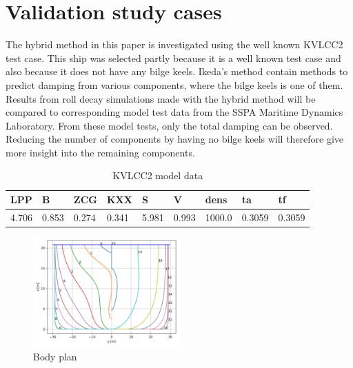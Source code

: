 \section{Validation study cases}\label{validation-study-cases}

\label{sec:validation}

    The hybrid method in this paper is investigated using the well known
KVLCC2 test case. This ship was selected partly because it is a well
known test case and also because it does not have any bilge keels.
Ikeda's method contain methods to predict damping from various
components, where the bilge keels is one of them. Results from roll
decay simulations made with the hybrid method will be compared to
corresponding model test data from the SSPA Maritime Dynamics
Laboratory. From these model tests, only the total damping can be
observed. Reducing the number of components by having no bilge keels
will therefore give more insight into the remaining components.
 
            
    
    
\begin{table}[H]
\small
\center
\caption{KVLCC2 model data}
\label{tab:kvlcc2_model_data}
\begin{tabular}{lllllllll}
\toprule\addlinespace
LPP & B & ZCG & KXX & S & V & dens & ta & tf\\ 
\midrule4.706 & 0.853 & 0.274 & 0.341 & 5.981 & 0.993 & 1000.0 & 0.3059 & 0.3059\\ 

\bottomrule
\end{tabular}
\end{table}

    
 
            
    
    \begin{figure}[H]
        \begin{center}\includegraphics[width = 0.5\textwidth]{figures/body_plan.png}\end{center}
        \vspace{-1cm}
        \caption{Body plan}
        \label{fig:body_plan}
    \end{figure}
    

    